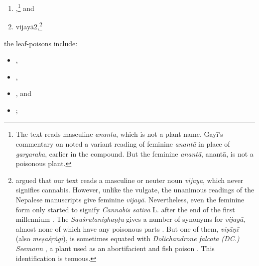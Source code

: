 \begin{translation}
\begin{itemize}
\begin{enumerate}
\item {},\footnote{The text reads masculine \emph{ananta}, which
        is not a plant name.  Gayī's commentary on  noted a variant 
        reading
        of feminine \emph{anantā} in place of \emph{gargaraka}, earlier in the compound. 
        But the feminine \emph{anantā}, \gls{anantā}, is not a poisonous plant.} and

\item \gls{vijayā2},\footnote{\citet[61, n.\,3]{meul-sear} argued that our text
    reads a masculine or neuter noun \emph{vijaya}, which never signifies cannabis.
    However, unlike the vulgate, the unanimous readings of the Nepalese manuscripts
    give feminine \emph{vijayā}.  Nevertheless, even the feminine form only started to
    signify \emph{Cannabis sativa} L. after the end of the first millennium
    \citep{meul-sear,wuja-cann,mchu-2021a}. The \emph{Sauśrutanighaṇṭu} gives a 
    number
    of synonyms for \emph{vijayā}, almost none of which have any poisonous parts
    \citep[5.77, 10.143]{suve-2000}.  But one of them, \emph{viṣāṇī} (also
    \emph{meṣaśṛṅgī}), is sometimes equated with \emph{Dolichandrone falcata (DC.)
    Seemann} \citep[518]{adps}, a plant used as an abortifacient and fish poison
    \citep[\#862]{nadk-1982}.  This identification is tenuous.} %
        \end{enumerate}
        \end{itemize}
    
        \item
        the leaf-poisons include:
             \begin{itemize}            
        \item {},
        \item {},
        \item {},
        and
        \item {};
            \end{itemize}


\end{translation}
